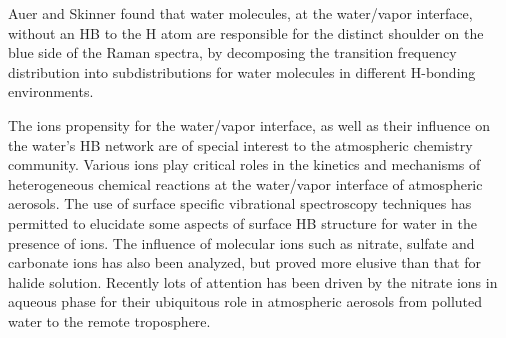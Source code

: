 Auer and Skinner\cite{Auer08} found that water molecules, at the water/vapor interface, without an HB to the H atom are responsible for the distinct shoulder on the blue side of the Raman spectra, by decomposing the transition frequency distribution into subdistributions for water molecules in different H-bonding environments.

The ions propensity for the water/vapor interface, as well as their influence on  
the water's HB network are of special interest to the atmospheric chemistry 
community.\cite{FPBJ,BJ} Various ions play critical roles in the kinetics 
and mechanisms of heterogeneous chemical reactions at the water/vapor interface of atmospheric aerosols. 
The use of surface specific vibrational spectroscopy techniques has 
permitted to elucidate some aspects of surface HB structure for water in 
the presence of ions.\cite{AJ12,AGL05} The influence of molecular ions such as nitrate­, sulfate­ and 
carbonate ions­ has also been analyzed, but proved more elusive than that for halide solution. \cite{SG05,PS03}
Recently lots of attention has been driven by the nitrate ions in aqueous phase for their 
ubiquitous role in atmospheric aerosols from polluted water to the remote troposphere.
\cite{BJ}



